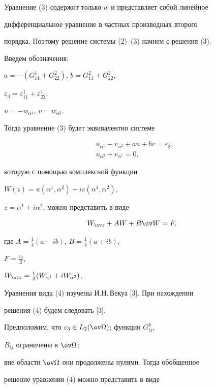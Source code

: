 Уравнение (3) содержит только $w$ и представляет собой линейное  


дифференциальное уравнение в частных производных второго 


порядка. Поэтому решение системы (2)--(3) начнем с решения (3). 


Введем обозначения:


$a=-(G^1_{11}+G^2_{22})$, $b=G^2_{11}+G^2_{22}$, 


$\varepsilon_3=\varepsilon^1_{11}+\varepsilon^1_{22}$, 


$u=-w_{\alpha^1}$, $v=w_{\alpha^2}$. 


Тогда уравнение (3) будет эквивалентно системе 


\begin{align*} 


&u_{\alpha^1}-v_{\alpha^2}+au+bv=\varepsilon_3, \\ 


&u_{\alpha^2}+v_{\alpha^1}=0, 


\end{align*} 


которую с помощью комплексной функции 


$W(z)=u(\alpha^1,\alpha^2)+iv(\alpha^1,\alpha^2)$, 


$z=\alpha^1+i\alpha^2$, можно представить в виде 


\begin{equation} 


W_{\ov z}+AW+B\ov W=F, 


\end{equation} 


где $A=\frac{1}{4}(a-ib)$, $B=\frac{1}{4}(a+ib)$, 


$F=\frac{\varepsilon_3}{2}$, 


$W_{\ov z}=\frac{1}{2}(W_{\alpha^1}+iW_{\alpha^2})$. 


 


Уравнения вида (4) изучены И.Н.\,Векуа [3]. При нахождении 


решения (4) будем следовать [3]. 


 


Предположим, что $\varepsilon_3\in L_2(\ov\Omega)$; функции $G^k_{ij}$, 


$B_{ij}$ ограничены в $\ov\Omega$; 


вне области $\ov\Omega$ они продолжены нулями. Тогда обобщенное 


решение уравнения (4) можно представить в виде 


